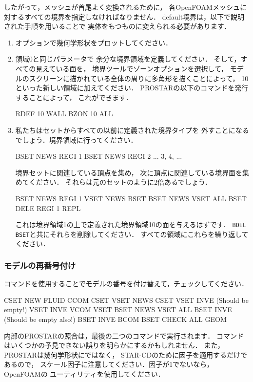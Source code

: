 したがって，メッシュが首尾よく変換されるために，
各OpenFOAMメッシュに対するすべての境界を指定しなければなりません．
default境界は，以下で説明された手順を用いることで
実体をもつものに変えられる必要があります．
\begin{enumerate}
 \item {}オプションで幾何学形状をプロットしてください．
 \item {}領域0と同じパラメータで
       余分な境界領域を定義してください．
       そして，すべての見えている面を，
       境界ツールでゾーンオプションを選択して，
       モデルのスクリーンに描かれている全体の周りに多角形を描くことによって，
       10といった新しい領域に加えてください．
       \textsf{PROSTAR}の以下のコマンドを発行することによって，
       これができます．
\begin{OFverbatim}[terminal]
RDEF 10 WALL
BZON 10 ALL
\end{OFverbatim}
 \item 私たちはセットからすべての以前に定義された境界タイプを
       外すことになるでしょう．境界領域に行ってください．
\begin{OFverbatim}[terminal]
BSET NEWS REGI 1
BSET NEWS REGI 2
... 3, 4, ...
\end{OFverbatim}
       境界セットに関連している頂点を集め，
       次に頂点に関連している境界面を集めてください．
       それらは元のセットのように$2$倍あるでしょう．
\begin{OFverbatim}[terminal]
BSET NEWS REGI 1
VSET NEWS BSET
BSET NEWS VSET ALL
BSET DELE REGI 1
REPL
\end{OFverbatim}
       これは境界領域1の上で定義された境界領域10の面を与えるはずです．
       \verb|BDEL BSET|と共にそれらを削除してください．
       すべての領域にこれらを繰り返してください．
\end{enumerate}

\subsubsection{モデルの再番号付け}
\label{sssec:5.5.2.4}
コマンドを使用することでモデルの番号を付け替えて，チェックしてください．
\begin{OFverbatim}[terminal]
CSET NEW FLUID
CCOM CSET
VSET NEWS CSET
VSET INVE (Should be empty!)
VSET INVE
VCOM VSET
BSET NEWS VSET ALL
BSET INVE (Should be empty also!)
BSET INVE
BCOM BSET
CHECK ALL
GEOM
\end{OFverbatim}
内部の\textsf{PROSTAR}の照合は，最後の二つのコマンドで実行されます．
コマンドはいくつかの予見できない誤りを明らかにするかもしれません．
また，\textsf{PROSTAR}は幾何学形状にではなく，
STAR-CDのために因子を適用するだけであるので，
スケール因子に注意してください．因子が1でないなら，
OpenFOAMの
%
%
ユーティリティを使用してください．

